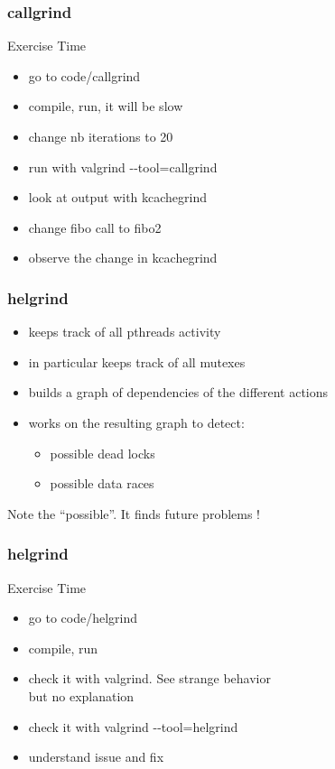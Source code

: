 \begin{frame}[fragile]
  \frametitle{callgrind}
  \begin{alertblock}{Exercise Time}
    \begin{itemize}
    \item go to code/callgrind
    \item compile, run, it will be slow
    \item change nb iterations to 20
    \item run with valgrind -{}-tool=callgrind
    \item look at output with kcachegrind
    \item change fibo call to fibo2
    \item observe the change in kcachegrind
    \end{itemize}
  \end{alertblock}
\end{frame}

\begin{frame}[fragile]
  \frametitle{helgrind}
  \begin{block}{}
    \begin{itemize}
      \item keeps track of all pthreads activity
      \item in particular keeps track of all mutexes
      \item builds a graph of dependencies of the different actions
      \item works on the resulting graph to detect:
        \begin{itemize}
        \item possible dead locks
        \item possible data races
        \end{itemize}
    \end{itemize}
  \end{block}
  \pause
  \begin{alertblock}{}
    Note the ``possible''. It finds future problems !
  \end{alertblock}
\end{frame}

\begin{frame}[fragile]
  \frametitle{helgrind}
  \begin{alertblock}{Exercise Time}
    \begin{itemize}
    \item go to code/helgrind
    \item compile, run
    \item check it with valgrind. See strange behavior \\
      but no explanation
    \item check it with valgrind -{}-tool=helgrind
    \item understand issue and fix
    \end{itemize}
  \end{alertblock}
\end{frame}

